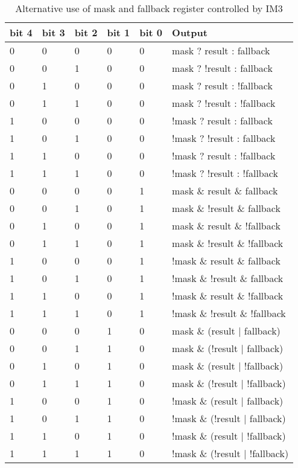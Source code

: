 \documentclass[forwardcom.tex]{subfiles}
\begin{document}
\begin{longtable} {|p{10mm}|p{10mm}|p{10mm}|p{10mm}|p{10mm}|p{60mm}|}
\caption{Alternative use of mask and fallback register controlled by IM3} 
\label{table:AlternativeMaskUseForTestBit} \\
\endfirsthead
\endhead
\hline
\bfseries bit 4 & \bfseries bit 3 & \bfseries bit 2 & \bfseries bit 1 & \bfseries bit 0 & \bfseries Output \\
\hline
0 & 0 & 0 & 0 & 0 & mask ? result : fallback \\
0 & 0 & 1 & 0 & 0 & mask ? !result : fallback \\
0 & 1 & 0 & 0 & 0 & mask ? result : !fallback \\
0 & 1 & 1 & 0 & 0 & mask ? !result : !fallback \\
1 & 0 & 0 & 0 & 0 & !mask ? result : fallback \\
1 & 0 & 1 & 0 & 0 & !mask ? !result : fallback \\
1 & 1 & 0 & 0 & 0 & !mask ? result : !fallback \\
1 & 1 & 1 & 0 & 0 & !mask ? !result : !fallback \\
\hline
0 & 0 & 0 & 0 & 1 & mask \& result \& fallback \\
0 & 0 & 1 & 0 & 1 & mask \& !result \& fallback \\
0 & 1 & 0 & 0 & 1 & mask \& result \& !fallback \\
0 & 1 & 1 & 0 & 1 & mask \& !result \& !fallback \\
1 & 0 & 0 & 0 & 1 & !mask \& result \& fallback \\
1 & 0 & 1 & 0 & 1 & !mask \& !result \& fallback \\
1 & 1 & 0 & 0 & 1 & !mask \& result \& !fallback \\
1 & 1 & 1 & 0 & 1 & !mask \& !result \& !fallback \\
\hline
0 & 0 & 0 & 1 & 0 & mask \& (result $|$ fallback) \\
0 & 0 & 1 & 1 & 0 & mask \& (!result $|$ fallback) \\
0 & 1 & 0 & 1 & 0 & mask \& (result $|$ !fallback) \\
0 & 1 & 1 & 1 & 0 & mask \& (!result $|$ !fallback) \\
1 & 0 & 0 & 1 & 0 & !mask \& (result $|$ fallback) \\
1 & 0 & 1 & 1 & 0 & !mask \& (!result $|$ fallback) \\
1 & 1 & 0 & 1 & 0 & !mask \& (result $|$ !fallback) \\
1 & 1 & 1 & 1 & 0 & !mask \& (!result $|$ !fallback) \\

\end{longtable}
\end{document}
